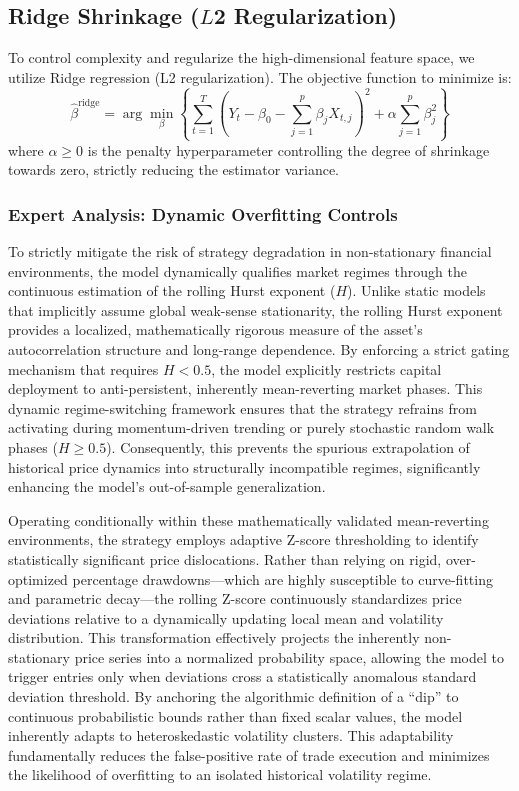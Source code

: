 \documentclass[12pt, a4paper]{article}
\begin{document}
\subsection{Ridge Shrinkage ($L$2 Regularization)}

To control complexity and regularize the high-dimensional feature space, we utilize Ridge regression (L2 regularization). The objective function to minimize is:
\begin{equation}
\hat{\beta}^{\text{ridge}} = \arg\min_{\beta} \left\{ \sum_{t=1}^{T} \left( Y_t - \beta_0 - \sum_{j=1}^{p} \beta_j X_{t,j} \right)^2 + \alpha \sum_{j=1}^{p} \beta_j^2 \right\}
\end{equation}
where $\alpha \ge 0$ is the penalty hyperparameter controlling the degree of shrinkage towards zero, strictly reducing the estimator variance.



\subsubsection*{Expert Analysis: Dynamic Overfitting Controls}
To strictly mitigate the risk of strategy degradation in non-stationary financial environments, the model dynamically qualifies market regimes through the continuous estimation of the rolling Hurst exponent ($H$). Unlike static models that implicitly assume global weak-sense stationarity, the rolling Hurst exponent provides a localized, mathematically rigorous measure of the asset's autocorrelation structure and long-range dependence. By enforcing a strict gating mechanism that requires $H < 0.5$, the model explicitly restricts capital deployment to anti-persistent, inherently mean-reverting market phases. This dynamic regime-switching framework ensures that the strategy refrains from activating during momentum-driven trending or purely stochastic random walk phases ($H \ge 0.5$). Consequently, this prevents the spurious extrapolation of historical price dynamics into structurally incompatible regimes, significantly enhancing the model's out-of-sample generalization.

Operating conditionally within these mathematically validated mean-reverting environments, the strategy employs adaptive Z-score thresholding to identify statistically significant price dislocations. Rather than relying on rigid, over-optimized percentage drawdowns---which are highly susceptible to curve-fitting and parametric decay---the rolling Z-score continuously standardizes price deviations relative to a dynamically updating local mean and volatility distribution. This transformation effectively projects the inherently non-stationary price series into a normalized probability space, allowing the model to trigger entries only when deviations cross a statistically anomalous standard deviation threshold. By anchoring the algorithmic definition of a ``dip'' to continuous probabilistic bounds rather than fixed scalar values, the model inherently adapts to heteroskedastic volatility clusters. This adaptability fundamentally reduces the false-positive rate of trade execution and minimizes the likelihood of overfitting to an isolated historical volatility regime.
\end{document}
